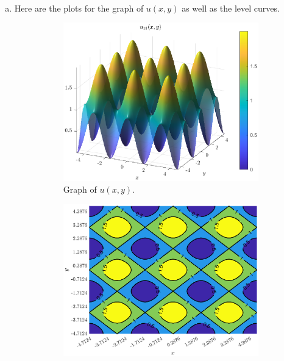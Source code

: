 \documentclass[12pt]{article} %
\begin{document}
\begin{solution}~
\begin{enumerate}[(a)]
\item Here are the plots for the graph of $u(x,y)$ as well as the level curves.
    \begin{figure}[H]
    	\centering
        \begin{subfigure}[b]{0.45\textwidth}
        \centering
    	\includegraphics[width=\textwidth]{figures/crystal_surface}
        \caption{Graph of $u(x,y)$.}
        \end{subfigure}
\hfill
        \begin{subfigure}[b]{0.45\textwidth}
        	\centering
        	\includegraphics[width=\textwidth]{figures/level_curves}

\end{subfigure}
\end{figure}
\end{enumerate}
\end{solution}
\end{document}
